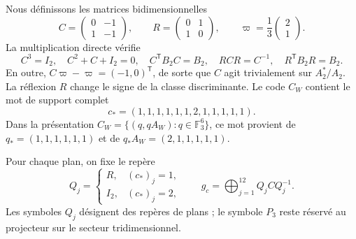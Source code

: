 Nous définissons les matrices bidimensionnelles
\[
 C=\begin{pmatrix}0&-1\\1&-1\end{pmatrix},
 \qquad
 R=\begin{pmatrix}0&1\\1&0\end{pmatrix},
 \qquad
 \varpi=\frac13\begin{pmatrix}2\\1\end{pmatrix}.
\]
La multiplication directe vérifie
\[
 C^3=I_2,\quad C^2+C+I_2=0,\quad
 C^{\mathsf T}B_2C=B_2,\quad
 RCR=C^{-1},\quad R^{\mathsf T}B_2R=B_2.
\]
En outre, \(C\varpi-\varpi=(-1,0)^{\mathsf T}\), de sorte que \(C\)
agit trivialement sur \(A_2^*/A_2\). La réflexion \(R\) change le signe
de la classe discriminante. Le code \(C_W\) contient le mot de
support complet
\[
 c_*=(1,1,1,1,1,1,2,1,1,1,1,1).
\]
Dans la présentation \(C_W=\{(q,qA_W):q\in\mathbb F_3^6\}\), ce mot provient de \(q_*=(1,1,1,1,1,1)\) et de \(q_*A_W=(2,1,1,1,1,1)\).

Pour chaque plan, on fixe le repère
\begin{equation}
 Q_j=\begin{cases}
 R,&(c_*)_j=1,\\
 I_2,&(c_*)_j=2,
 \end{cases}
 \qquad
 g_c=\bigoplus_{j=1}^{12}Q_jCQ_j^{-1}.
 \label{eq:leech-c3}
\end{equation}
Les symboles \(Q_j\) désignent des repères de plans ; le symbole \(P_3\) reste réservé au projecteur sur le secteur tridimensionnel.


